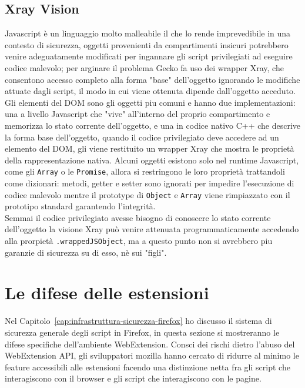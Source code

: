 \documentclass{sapthesis}
\newcommand{\code}[1]{\texttt{#1}}
\newcommand{\Capitolo}[1]{Capitolo~\ref{#1}}
\begin{document}
        \subsection{Xray Vision}
        \label{sec:sicurezza-xray-vision}
            Javascript è un linguaggio molto malleabile il che lo rende imprevedibile in una contesto di
            sicurezza, oggetti provenienti da compartimenti insicuri potrebbero venire adeguatamente
            modificati per ingannare gli script privilegiati ad eseguire codice malevolo; per arginare
            il problema Gecko fa uso dei wrapper Xray, che consentono accesso completo alla forma "base"
            dell'oggetto ignorando le modifiche attuate dagli script, il modo in cui viene ottenuta
            dipende dall'oggetto acceduto.\\
            Gli elementi del DOM sono gli oggetti piu comuni e hanno due implementazioni: 
            una a livello Javascript che "vive" all'interno del proprio compartimento e memorizza lo
            stato corrente dell'oggetto, e una in codice nativo C++ che descrive la forma base
            dell'oggetto, quando il codice privilegiato deve accedere ad un elemento del DOM, gli viene
            restituito un wrapper Xray che mostra le proprietà della rappresentazione nativa. 
            Alcuni oggetti esistono solo nel runtime Javascript, come gli \code{Array} o le \code{Promise},
            allora si restringono le loro proprietà trattandoli come dizionari: metodi, getter e setter 
            sono ignorati per impedire l'esecuzione di codice malevolo mentre il prototype di \code{Object}
            e \code{Array} viene rimpiazzato con il prototipo standard garantendo l'integrità.\\
            Semmai il codice privilegiato avesse bisogno di conoscere lo stato corrente dell'oggetto la
            visione Xray può venire attenuata programmaticamente accedendo alla prorpietà \code{.wrappedJSObject},
            ma a questo punto non si avrebbero piu garanzie di sicurezza su di esso, nè sui "figli".

    
    \section{Le difese delle estensioni}
        Nel \Capitolo{cap:infrastruttura-sicurezza-firefox} ho discusso il sistema di sicurezza generale
        degli script in Firefox, in questa sezione si mostreranno le difese specifiche dell'ambiente
        WebExtension. Consci dei rischi dietro l'abuso del WebExtension API, gli sviluppatori mozilla
        hanno cercato di ridurre al minimo le feature accessibili alle estensioni facendo una
        distinzione netta fra gli script che interagiscono con il browser e gli script che interagiscono
        con le pagine.
    
\end{document}
